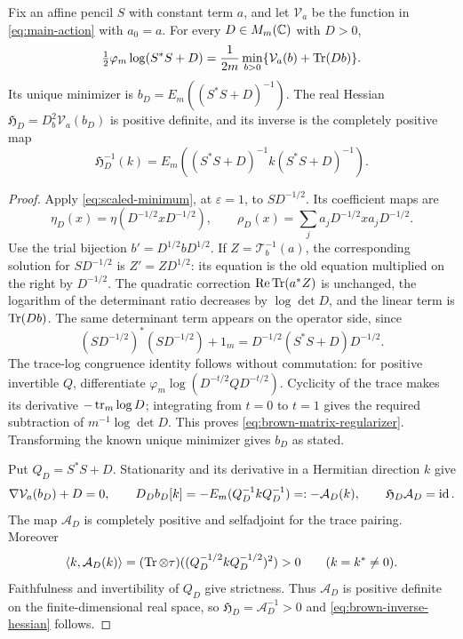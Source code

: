 \begin{lemma}\label{lem:brown-matrix-regularizer}
Fix an affine pencil $S$ with constant term $a$, and let $\mathcal V_a$ be the function in \eqref{eq:main-action} with $a_0=a$.
For every $D\in M_m(\mathbb C)$ with $D>0$,
\begin{equation}\label{eq:brown-matrix-regularizer}
 \tfrac12\varphi_m\log(S^*S+D)
 =\frac1{2m}\min_{b>0}\{\mathcal V_a(b)+\operatorname{Tr}(Db)\}.
\end{equation}
Its unique minimizer is $b_D=E_m((S^*S+D)^{-1})$.
The real Hessian $\mathfrak H_D=D_b^2\mathcal V_a(b_D)$ is positive definite, and its inverse is the completely positive map
\begin{equation}\label{eq:brown-inverse-hessian}
 \mathfrak H_D^{-1}(k)
 =E_m((S^*S+D)^{-1}k(S^*S+D)^{-1}).
\end{equation}
\end{lemma}
\begin{proof}
Apply \eqref{eq:scaled-minimum}, at $\varepsilon=1$, to $SD^{-1/2}$.
Its coefficient maps are
\[
 \eta_D(x)=\eta(D^{-1/2}xD^{-1/2}),\qquad
 \rho_D(x)=\sum_j a_jD^{-1/2}xa_jD^{-1/2}.
\]
Use the trial bijection $b'=D^{1/2}bD^{1/2}$.
If $Z=\mathcal T_b^{-1}(a)$, the corresponding solution for $SD^{-1/2}$ is $Z'=ZD^{1/2}$: its equation is the old equation multiplied on the right by $D^{-1/2}$.
The quadratic correction $\operatorname{Re}\operatorname{Tr}(a^*Z)$ is unchanged, the logarithm of the determinant ratio decreases by $\log\det D$, and the linear term is $\operatorname{Tr}(Db)$.
The same determinant term appears on the operator side, since
\[
 (SD^{-1/2})^*(SD^{-1/2})+1_m
   =D^{-1/2}(S^*S+D)D^{-1/2}.
\]
The trace-log congruence identity follows without commutation: for positive invertible $Q$, differentiate $\varphi_m\log(D^{-t/2}QD^{-t/2})$.
Cyclicity of the trace makes its derivative $-\operatorname{tr}_m\log D$; integrating from $t=0$ to $t=1$ gives the required subtraction of $m^{-1}\log\det D$.
This proves \eqref{eq:brown-matrix-regularizer}.
Transforming the known unique minimizer gives $b_D$ as stated.

Put $Q_D=S^*S+D$.
Stationarity and its derivative in a Hermitian direction $k$ give
\[
 \nabla\mathcal V_a(b_D)+D=0,\qquad
 D_Db_D[k]=-E_m(Q_D^{-1}kQ_D^{-1})=:-\mathcal A_D(k),
 \qquad \mathfrak H_D\mathcal A_D=\operatorname{id}.
\]
The map $\mathcal A_D$ is completely positive and selfadjoint for the trace pairing.
Moreover
\[
 \langle k,\mathcal A_D(k)\rangle
  =(\operatorname{Tr}\otimes\tau)
       ((Q_D^{-1/2}kQ_D^{-1/2})^2)>0
       \qquad(k=k^*\ne0).
\]
Faithfulness and invertibility of $Q_D$ give strictness.
Thus $\mathcal A_D$ is positive definite on the finite-dimensional real space, so $\mathfrak H_D=\mathcal A_D^{-1}>0$ and \eqref{eq:brown-inverse-hessian} follows.
\end{proof}

